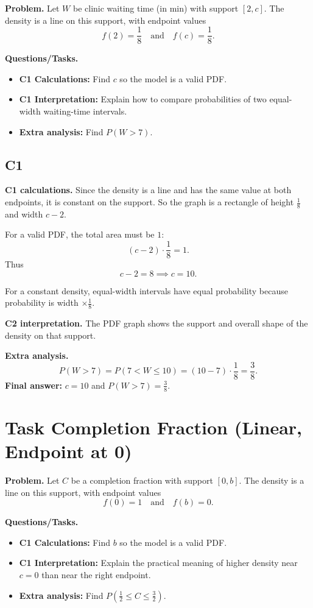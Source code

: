 	\textbf{Problem.}
	Let $W$ be clinic waiting time (in min) with support $[2,c]$. The density is a line on this support, with endpoint values
	\[
	f(2)=\frac18
	\quad\text{and}\quad
	f(c)=\frac18.
	\]
	
	\textbf{Questions/Tasks.}
	\begin{itemize}
		\item \textbf{C1 Calculations:} Find $c$ so the model is a valid PDF.
		\item \textbf{C1 Interpretation:} Explain how to compare probabilities of two equal-width waiting-time intervals.
		\item \textbf{Extra analysis:} Find $P(W>7)$.
	\end{itemize}
	
	\subsection*{C1}
	
	\textbf{C1 calculations.}
	Since the density is a line and has the same value at both endpoints, it is constant on the support. So the graph is a rectangle of height $\frac18$ and width $c-2$.
	
	For a valid PDF, the total area must be $1$:
	\[
	(c-2)\cdot\frac18=1.
	\]
	Thus
	\[
	c-2=8\implies c=10.
	\]
	
	For a constant density, equal-width intervals have equal probability because probability is width $\times \frac18$.
	
	\textbf{C2 interpretation.}
	The PDF graph shows the support and overall shape of the density on that support.
	
	\textbf{Extra analysis.}
	\[
	P(W>7)=P(7<W\le10)=(10-7)\cdot\frac18=\frac38.
	\]
	\textbf{Final answer:} $c=10$ and $P(W>7)=\frac38$.
	
	\section{Task Completion Fraction (Linear, Endpoint at 0)}
	
	\textbf{Problem.}
	Let $C$ be a completion fraction with support $[0,b]$. The density is a line on this support, with endpoint values
	\[
	f(0)=1
	\quad\text{and}\quad
	f(b)=0.
	\]
	
	\textbf{Questions/Tasks.}
	\begin{itemize}
		\item \textbf{C1 Calculations:} Find $b$ so the model is a valid PDF.
		\item \textbf{C1 Interpretation:} Explain the practical meaning of higher density near $c=0$ than near the right endpoint.
		\item \textbf{Extra analysis:} Find $P\!\left(\frac{1}{2}\le C\le \frac{3}{2}\right)$.
	\end{itemize}
	
